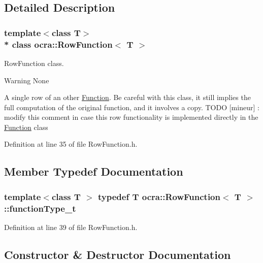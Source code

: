 \subsection{Detailed Description}
\subsubsection*{template$<$class T$>$\\*
class ocra\+::\+Row\+Function$<$ T $>$}

Row\+Function class. 

\begin{DoxyWarning}{Warning}
None
\end{DoxyWarning}
A single row of an other \hyperlink{classocra_1_1Function}{Function}. Be careful with this class, it still implies the full computation of the original function, and it involves a copy. T\+O\+DO \mbox{[}mineur\mbox{]} \+: modify this comment in case this row functionality is implemented directly in the \hyperlink{classocra_1_1Function}{Function} class 

Definition at line 35 of file Row\+Function.\+h.



\subsection{Member Typedef Documentation}
\subsubsection[{\texorpdfstring{function\+Type\+\_\+t}{functionType_t}}]{\setlength{\rightskip}{0pt plus 5cm}template$<$class T $>$ typedef T {\bf ocra\+::\+Row\+Function}$<$ T $>$\+::{\bf function\+Type\+\_\+t}}\hypertarget{classocra_1_1RowFunction_a4b6faf57022f367fdcff681c2dc98306}{}\label{classocra_1_1RowFunction_a4b6faf57022f367fdcff681c2dc98306}


Definition at line 39 of file Row\+Function.\+h.



\subsection{Constructor \& Destructor Documentation}

